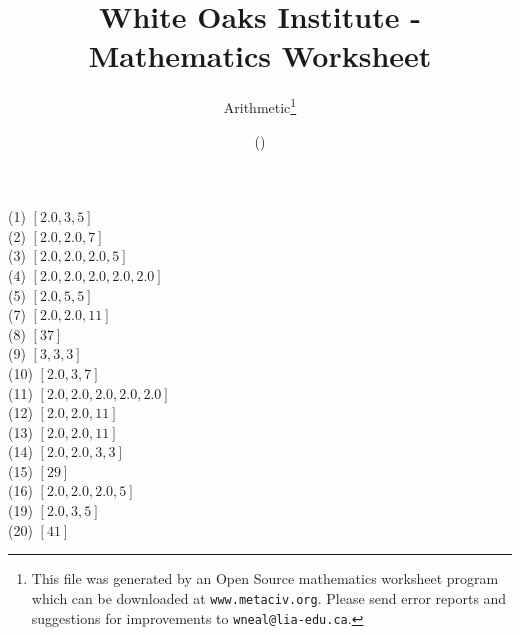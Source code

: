 \documentclass[letter]{article}
\begin{document}
\title{White Oaks Institute - Mathematics Worksheet}
\author{Arithmetic\thanks{This file was generated by an \textsf{Open Source} mathematics worksheet program which can be downloaded at \texttt{www.metaciv.org}. Please send error reports and suggestions for improvements to \texttt{wneal@lia-edu.ca}.}}
\date{\XCfileversion{} (\XCfiledate)}
\maketitle
\setlength{\parskip}{12mm plus 4mm minus 4mm}\setlength{\parindent}{0cm}\begin{multicols}{2}(1) $[2.0, 3, 5]$\\(2) $[2.0, 2.0, 7]$\\(3) $[2.0, 2.0, 2.0, 5]$\\(4) $[2.0, 2.0, 2.0, 2.0, 2.0]$\\(5) $[2.0, 5, 5]$\\(7) $[2.0, 2.0, 11]$\\(8) $[37]$\\(9) $[3, 3, 3]$\\(10) $[2.0, 3, 7]$\\(11) $[2.0, 2.0, 2.0, 2.0, 2.0]$\\(12) $[2.0, 2.0, 11]$\\(13) $[2.0, 2.0, 11]$\\(14) $[2.0, 2.0, 3, 3]$\\(15) $[29]$\\(16) $[2.0, 2.0, 2.0, 5]$\\(19) $[2.0, 3, 5]$\\(20) $[41]$\\\end{multicols}
\end{document}
